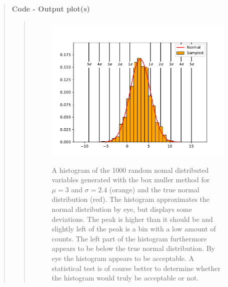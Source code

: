 \begin{quote}
\textbf{Code - Output plot(s)}
\begin{quote}
\begin{figure}[!ht]
\centering
\includegraphics[width=12cm, height=7.5cm]{./Plots/1_hist_gaussian.pdf}
\caption{A histogram of the 1000 random nomal distributed variables generated with the box muller method for $\mu = 3$ and $\sigma = 2.4$  (orange) and the true normal distribution (red). The histogram approximates the normal distribution by eye, but displays some deviations. The peak is higher than it should be and slightly left of the peak is a bin with a low amount of counts. The left part of the histogram furthermore appears to be below the true normal distribution. By eye the histogram appears to be acceptable. A statistical test is of course better to determine whether the histogram would truly be acceptable or not.}
\end{figure}

\end{quote}
\end{quote}

%

%


%
\newpage











